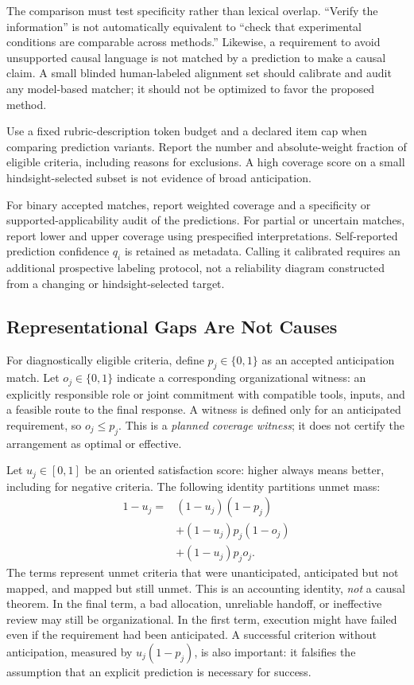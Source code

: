 The comparison must test specificity rather than lexical overlap. ``Verify the information'' is not automatically equivalent to ``check that experimental conditions are comparable across methods.'' Likewise, a requirement to avoid unsupported causal language is not matched by a prediction to make a causal claim. A small blinded human-labeled alignment set should calibrate and audit any model-based matcher; it should not be optimized to favor the proposed method.

Use a fixed rubric-description token budget and a declared item cap when comparing prediction variants. Report the number and absolute-weight fraction of eligible criteria, including reasons for exclusions. A high coverage score on a small hindsight-selected subset is not evidence of broad anticipation.

For binary accepted matches, report weighted coverage and a specificity or supported-applicability audit of the predictions. For partial or uncertain matches, report lower and upper coverage using prespecified interpretations. Self-reported prediction confidence $q_i$ is retained as metadata. Calling it calibrated requires an additional prospective labeling protocol, not a reliability diagram constructed from a changing or hindsight-selected target.

\subsection{Representational Gaps Are Not Causes}

For diagnostically eligible criteria, define $p_j\in\{0,1\}$ as an accepted anticipation match. Let $o_j\in\{0,1\}$ indicate a corresponding organizational witness: an explicitly responsible role or joint commitment with compatible tools, inputs, and a feasible route to the final response. A witness is defined only for an anticipated requirement, so $o_j\leq p_j$. This is a \emph{planned coverage witness}; it does not certify the arrangement as optimal or effective.

Let $u_j\in[0,1]$ be an oriented satisfaction score: higher always means better, including for negative criteria. The following identity partitions unmet mass:
\begin{align}
1-u_j={}&(1-u_j)(1-p_j)\nonumber\\
&+(1-u_j)p_j(1-o_j)\nonumber\\
&+(1-u_j)p_jo_j.\label{eq:partition}
\end{align}
The terms represent unmet criteria that were unanticipated, anticipated but not mapped, and mapped but still unmet. This is an accounting identity, \emph{not} a causal theorem. In the final term, a bad allocation, unreliable handoff, or ineffective review may still be organizational. In the first term, execution might have failed even if the requirement had been anticipated. A successful criterion without anticipation, measured by $u_j(1-p_j)$, is also important: it falsifies the assumption that an explicit prediction is necessary for success.

